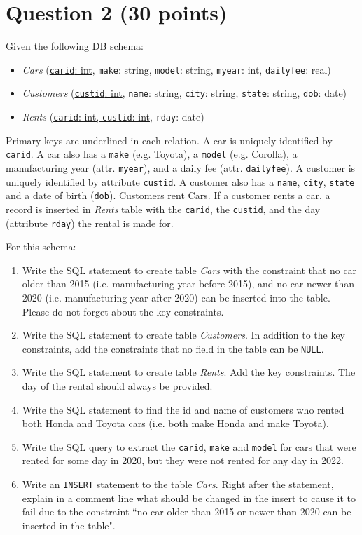 \documentclass[letterpaper, 11pt]{article}
\begin{document}
\section*{Question 2 (30 points)}

Given the following DB schema:
\begin{itemize}
    \item \textit{Cars} (\ul{\texttt{carid}: int}, \texttt{make}: string, \texttt{model}: string, \texttt{myear}: int, \texttt{dailyfee}: real)
    \item \textit{Customers} (\ul{\texttt{custid}: int}, \texttt{name}: string, \texttt{city}: string, \texttt{state}: string, \texttt{dob}: date)
    \item \textit{Rents} (\ul{\texttt{carid}: int, \texttt{custid}: int}, \texttt{rday}: date)
\end{itemize}

Primary keys are underlined in each relation. A car is uniquely identified by \texttt{carid}. A car also has a \texttt{make} (e.g. Toyota), a \texttt{model} (e.g. Corolla), a manufacturing year (attr. \texttt{myear}), and a daily fee (attr. \texttt{dailyfee}). A customer is uniquely identified by attribute \texttt{custid}. A customer also has a \texttt{name}, \texttt{city}, \texttt{state} and a date of birth (\texttt{dob}). Customers rent Cars. If a customer rents a car, a record is inserted in \textit{Rents} table with the \texttt{carid}, the \texttt{custid}, and the day (attribute \texttt{rday}) the rental is made for.

For this schema:
\begin{enumerate}[label={\alph*})]
    \item Write the SQL statement to create table \textit{Cars} with the constraint that no car older than 2015 (i.e. manufacturing year before 2015), and no car newer than 2020 (i.e. manufacturing year after 2020) can be inserted into the table. Please do not forget about the key constraints. 
    \item Write the SQL statement to create table \textit{Customers}. In addition to the key constraints, add the constraints that no field in the table can be \texttt{NULL}.
    \item Write the SQL statement to create table \textit{Rents}. Add the key constraints. The day of the rental should always be provided.
    \item Write the SQL statement to find the id and name of customers who rented both Honda and Toyota cars (i.e. both make Honda and make Toyota).
    \item Write the SQL query to extract the \texttt{carid}, \texttt{make} and \texttt{model} for cars that were rented for some day in 2020, but they were not rented for any day in 2022.
    \item Write an \texttt{INSERT} statement to the table \textit{Cars}. Right after the statement, explain in a comment line what should be changed in the insert to cause it to fail due to the constraint ``no car older than 2015 or newer than 2020 can be inserted in the table".
\end{enumerate}
\end{document}

